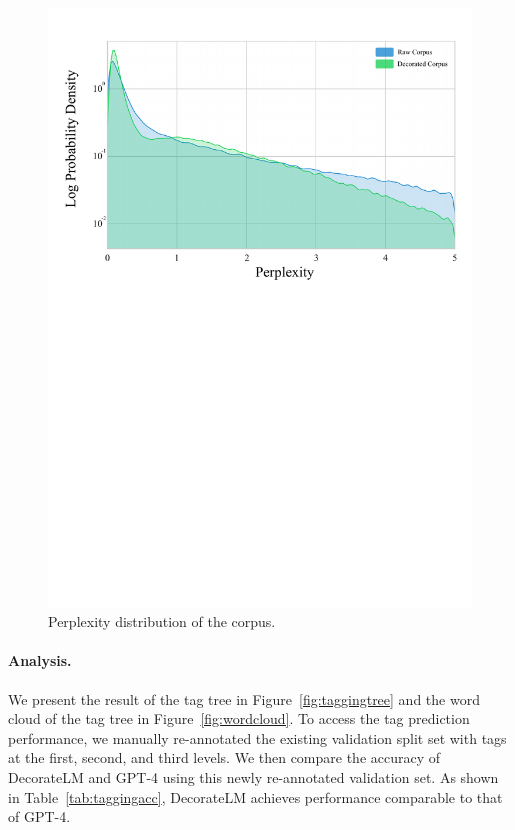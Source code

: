 \documentclass[11pt]{article}
\begin{document}
\begin{figure}[t]
    \centering
    \includegraphics[width=0.8\columnwidth]{figs/ppl.pdf}
    \caption{Perplexity distribution of the corpus.}
    \label{fig:ppl}
\end{figure}

\paragraph{Analysis.} We present the result of the tag tree in Figure~\ref{fig:taggingtree} and the word cloud of the tag tree in Figure~\ref{fig:wordcloud}.
To access the tag prediction performance, we manually re-annotated the existing validation split set with tags at the first, second, and third levels. We then compare the accuracy of DecorateLM and GPT-4 using this newly re-annotated validation set. As shown in Table~\ref{tab:taggingacc}, DecorateLM achieves performance comparable to that of GPT-4.
\end{document}
